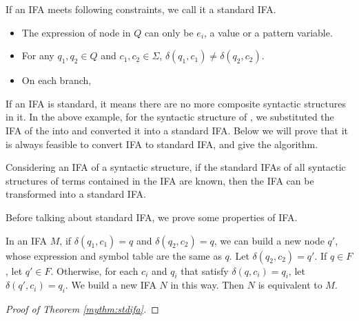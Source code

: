 \begin{Def}
\label{def:stdifa}
If an IFA meets following constraints, we call it a standard IFA.
\begin{itemize}
    \item The expression of node in $Q$ can only be $e_i$, a value or a pattern variable.
    \item For any $q_1,q_2 \in Q$ and $c_1, c_2 \in \Sigma$, $\delta(q_1, c_1) \neq \delta(q_2, c_2)$.
    \item On each branch,
\end{itemize}
\end{Def}

If an IFA is standard, it means there are no more composite syntactic structures in it. In the above example, for the syntactic structure of , we substituted the IFA of the  into  and converted it into a standard IFA. Below we will prove that it is always feasible to convert IFA to standard IFA, and give the algorithm.

\begin{mythm}
\label{mythm:stdifa}
Considering an IFA of a syntactic structure, if the standard IFAs of all syntactic structures of terms contained in the IFA are known, then the IFA can be transformed into a standard IFA.
\end{mythm}



Before talking about standard IFA, we prove some properties of IFA.

\begin{lemma}[Splittablity]
\label{lemma:splittablity}
In an IFA $M$, if $\delta(q_1, c_1)=q$ and $\delta(q_2, c_2)=q$, we can build a new node $q'$, whose expression and symbol table are the same as $q$. Let $\delta(q_2, c_2)=q'$. If $q \in F$, let $q' \in F$. Otherwise, for each $c_i$ and $q_i$ that satisfy $\delta(q, c_i)=q_i$, let $\delta(q', c_i)=q_i$. We build a new IFA $N$ in this way. Then $N$ is equivalent to $M$.
\end{lemma}

\begin{lemma}[]

\end{lemma}





\begin{proof}[Proof of Theorem \ref{mythm:stdifa}]

\end{proof}

